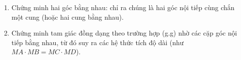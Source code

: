 \begin{enumerate}
\item Chứng minh hai góc bằng nhau: chỉ ra chúng là hai góc nội tiếp cùng chắn một cung (hoặc hai cung bằng nhau).
\item Chứng minh tam giác đồng dạng theo trường hợp (g.g) nhờ các cặp góc nội tiếp bằng nhau, từ đó suy ra các hệ thức tích độ dài (như $MA \cdot MB = MC \cdot MD$).
\end{enumerate}
